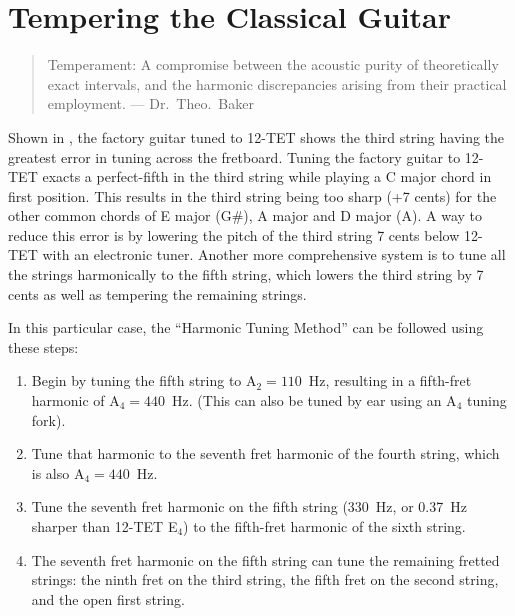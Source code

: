 %
%
%

 \section{Tempering the Classical Guitar\label{app:temp}}

 \begin{quote}
 Temperament: A compromise between the acoustic purity of theoretically exact intervals, and the harmonic discrepancies arising from their practical employment. --- Dr.\ Theo.\ Baker~\cite{ref:baker1895dmt}
 \end{quote}

Shown in , the factory guitar tuned to 12-TET shows the third string having the greatest error in tuning across the fretboard. Tuning the factory guitar to 12-TET exacts a perfect-fifth in the third string while playing a C major chord in first position. This results in the third string being too sharp (+7 cents) for the other common chords of E major (G\#), A major and D major (A). A way to reduce this error is by lowering the pitch of the third string 7 cents below 12-TET with an electronic tuner. Another more comprehensive system is to tune all the strings harmonically to the fifth string, which lowers the third string by 7 cents as well as tempering the remaining strings.

In this particular case, the ``Harmonic Tuning Method'' can be followed using these steps:
 \begin{enumerate}
  \item Begin by tuning the fifth string to A$_2 = 110$~Hz, resulting in a fifth-fret harmonic of A$_4 = 440$~Hz. (This can also be tuned by ear using an A$_4$ tuning fork).
  \item Tune that harmonic to the seventh fret harmonic of the fourth string, which is also A$_4 = 440$~Hz.
  \item Tune the seventh fret harmonic on the fifth string (330~Hz, or 0.37~Hz sharper than 12-TET E$_4$) to the fifth-fret harmonic of the sixth string.
  \item The seventh fret harmonic on the fifth string can tune the remaining fretted strings: the ninth fret on the third string, the fifth fret on the second string, and the open first string.
 \end{enumerate}

